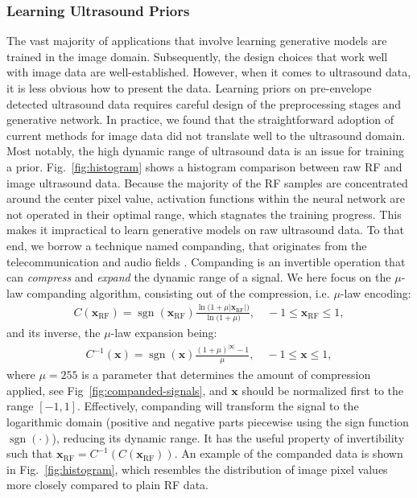 \documentclass[journal,twoside,web]{ieeecolor}
\newcommand{\bx}{{\mathbf x}}
\DeclareMathOperator{\sign}{sgn}
\begin{document}
\subsubsection{Learning Ultrasound Priors}
The vast majority of applications that involve learning generative models are trained in the image domain. Subsequently, the design choices that work well with image data are well-established. However, when it comes to ultrasound data, it is less obvious how to present the data. Learning priors on pre-envelope detected ultrasound data requires careful design of the preprocessing stages and generative network. In practice, we found that the straightforward adoption of current methods for image data did not translate well to the ultrasound domain. Most notably, the high dynamic range of ultrasound data is an issue for training a prior. Fig.~\ref{fig:histogram} shows a histogram comparison between raw RF and image ultrasound data. Because the majority of the RF samples are concentrated around the center pixel value, activation functions within the neural network are not operated in their optimal range, which stagnates the training progress. This makes it impractical to learn generative models on raw ultrasound data. To that end, we borrow a technique named companding, that originates from the telecommunication and audio fields \cite{sklar2021digital}. Companding is an invertible operation that can \emph{compress} and \emph{expand} the dynamic range of a signal. We here focus on the $\mu$-law companding algorithm, consisting out of the compression, i.e. $\mu$-law encoding:
\begin{align}
    C(\bx_{\text{RF}}) = \sign(\bx_{\text{RF}})\frac{\ln({1 + \mu \vert \bx_{\text{RF}} \vert)}}{\ln({1 + \mu)}}, \quad -1\leq \bx_{\text{RF}} \leq 1,
\end{align}
and its inverse, the $\mu$-law expansion being:
\begin{align}
    C^{-1}(\bx) = \sign(\bx)\frac{(1 + \mu)^{\vert \bx \vert} - 1}{\mu}, \quad -1\leq \bx \leq 1,
\end{align}
where $\mu=255$ is a parameter that determines the amount of compression applied, see Fig~\ref{fig:companded-signals}, and $\bx$ should be normalized first to the range $[-1, 1]$. Effectively, companding will transform the signal to the logarithmic domain (positive and negative parts piecewise using the sign function $\sign(\cdot)$), reducing its dynamic range. It has the useful property of invertibility such that $\bx_\text{RF} = C^{-1}(C(\bx_\text{RF}))$. An example of the companded data is shown in Fig.~\ref{fig:histogram}, which resembles the distribution of image pixel values more closely compared to plain RF data.
\end{document}
